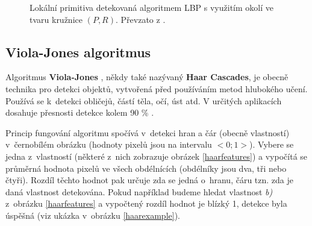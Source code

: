 \begin{figure}[H]
  \begin{center}
  \label{lbpprimitives}
  \caption{Lokální primitiva detekovaná algoritmem LBP s využitím okolí ve tvaru kružnice $(P, R)$. Převzato z \cite{localBinaryPatternsTests}.}
  \end{center}
\end{figure}

\subsection*{Viola-Jones algoritmus}
\label{sekce:viola_jones}
Algoritmus \textbf{Viola-Jones} \cite{violaJonesArticle, violaJones}, někdy také nazývaný \textbf{Haar Cascades}, je obecně technika pro detekci objektů, vytvořená před používáním metod hlubokého učení. Používá se k~detekci obličejů, částí těla, očí, úst atd. V určitých aplikacích dosahuje přesnosti detekce kolem 90 \% \cite{violaJones}. 

Princip fungování algoritmu spočívá v~detekci hran a čár (obecně vlastností) v~černobílém obrázku (hodnoty pixelů jsou na intervalu $<0; 1>$). Vybere se jedna z~vlastností (některé z~nich zobrazuje obrázek \ref{haarfeatures}) a vypočítá se průměrná hodnota pixelů ve všech obdélnících (obdélníky jsou dva, tři nebo čtyři). Rozdíl těchto hodnot pak určuje zda se jedná o~hranu, čáru tzn. zda je daná vlastnost detekována. Pokud například budeme hledat vlastnost \emph{b)} z~obrázku \ref{haarfeatures} a vypočtený rozdíl hodnot je blízký 1, detekce byla úspěšná (viz ukázka v~obrázku \ref{haarexample}).

